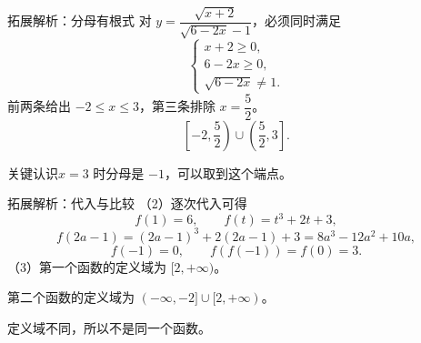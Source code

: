 \documentclass[aspectratio=169,10pt]{beamer}
\newcommand{\key}[1]{\begin{block}{关键认识}#1\end{block}}
\begin{document}
\begin{frame}[t]{拓展解析：分母有根式}
对 $y=\dfrac{\sqrt{x+2}}{\sqrt{6-2x}-1}$，必须同时满足
\[\begin{cases}x+2\ge0,\\6-2x\ge0,\\\sqrt{6-2x}\ne1.\end{cases}\]
前两条给出 $-2\le x\le3$，第三条排除 $x=\dfrac52$。
\[\boxed{\left[-2,\frac52\right)\cup\left(\frac52,3\right].}\]
\key{$x=3$ 时分母是 $-1$，可以取到这个端点。}
\end{frame}
\begin{frame}[t]{拓展解析：代入与比较}
（2）逐次代入可得
\[f(1)=6,\qquad f(t)=t^3+2t+3,\]
\[f(2a-1)=(2a-1)^3+2(2a-1)+3=8a^3-12a^2+10a,\]
\[f(-1)=0,\qquad f(f(-1))=f(0)=3.\]
（3）第一个函数的定义域为 $[2,+\infty)$。\par
第二个函数的定义域为 $(-\infty,-2]\cup[2,+\infty)$。\par
定义域不同，所以不是同一个函数。
\end{frame}
\end{document}

